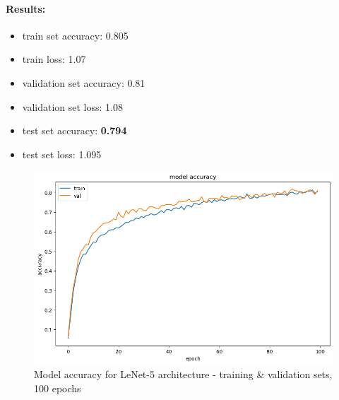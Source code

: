 \documentclass[12pt]{article}
\begin{document}
        \paragraph{Results:}
          \begin{itemize}
            \item train set accuracy: 0.805
            \item train loss: 1.07
            \item validation set accuracy: 0.81
            \item validation set loss: 1.08
            \item test set accuracy: \textbf{0.794}
            \item test set loss: 1.095
          \end{itemize}
              \begin{figure}[H]
                \includegraphics[width=\linewidth]{images/lenet.png}
                \caption{Model accuracy for LeNet-5 architecture - training \& validation sets, 100 epochs}
                \label{fig:lenet}
              \end{figure}
\end{document}
